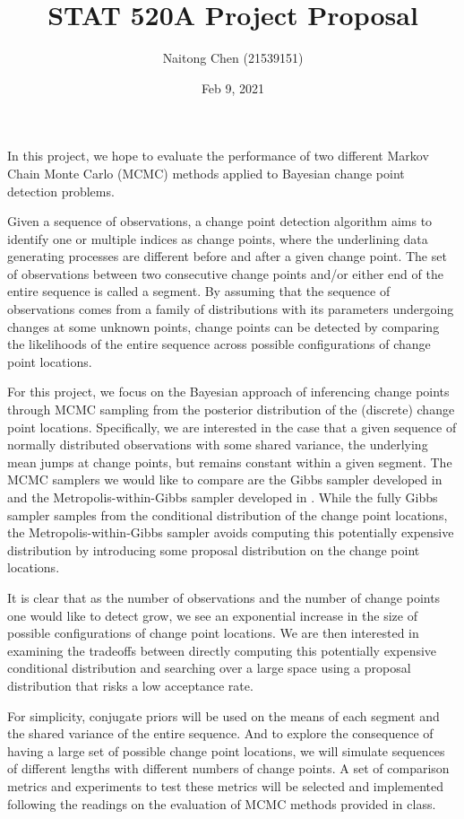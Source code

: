 \documentclass{article}
\begin{document}
\title{STAT 520A Project Proposal}
\author{Naitong Chen (21539151)}
\date{Feb 9, 2021}
\maketitle

In this project, we hope to evaluate the performance of two different Markov Chain Monte Carlo (MCMC) methods applied to Bayesian change point detection problems.

Given a sequence of observations, a change point detection algorithm aims to identify one or multiple indices as change points, where the underlining data generating processes are different before and after a given change point. The set of observations between two consecutive change points and/or either end of the entire sequence is called a segment. By assuming that the sequence of observations comes from a family of distributions with its parameters undergoing changes at some unknown points, change points can be detected by comparing the likelihoods of the entire sequence across possible configurations of change point locations.

For this project, we focus on the Bayesian approach of inferencing change points through MCMC sampling from the posterior distribution of the (discrete) change point locations. Specifically, we are interested in the case that a given sequence of normally distributed observations with some shared variance, the underlying mean jumps at change points, but remains constant within a given segment. The MCMC samplers we would like to compare are the Gibbs sampler developed in \cite{carlin1992hierarchical} and the Metropolis-within-Gibbs sampler developed in \cite{antoch2008application}. While the fully Gibbs sampler samples from the conditional distribution of the change point locations, the Metropolis-within-Gibbs sampler avoids computing this potentially expensive distribution by introducing some proposal distribution on the change point locations. 

It is clear that as the number of observations and the number of change points one would like to detect grow, we see an exponential increase in the size of possible configurations of change point locations. We are then interested in examining the tradeoffs between directly computing this potentially expensive conditional distribution and searching over a large space using a proposal distribution that risks a low acceptance rate.

For simplicity, conjugate priors will be used on the means of each segment and the shared variance of the entire sequence. And to explore the consequence of having a large set of possible change point locations, we will simulate sequences of different lengths with different numbers of change points. A set of comparison metrics and experiments to test these metrics will be selected and implemented following the readings on the evaluation of MCMC methods provided in class.
\end{document}
